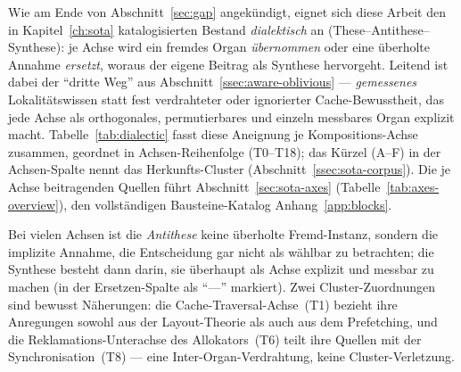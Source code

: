 Wie am Ende von Abschnitt~\ref{sec:gap} angekündigt, eignet sich diese Arbeit den in
Kapitel~\ref{ch:sota} katalogisierten Bestand \emph{dialektisch} an (These--Antithese--Synthese): je
Achse wird ein fremdes Organ \emph{übernommen} oder eine überholte Annahme \emph{ersetzt}, woraus der
eigene Beitrag als Synthese hervorgeht. Leitend ist dabei der \enquote{dritte Weg} aus
Abschnitt~\ref{ssec:aware-oblivious} --- \emph{gemessenes} Lokalitätswissen statt fest verdrahteter
oder ignorierter Cache-Bewusstheit, das jede Achse als orthogonales, permutierbares und einzeln
messbares Organ explizit macht.
Tabelle~\ref{tab:dialectic} fasst diese Aneignung je Kompositions-Achse zusammen, geordnet in
Achsen-Reihenfolge (T0--T18); das Kürzel (A--F) in der Achsen-Spalte nennt das Herkunfts-Cluster
(Abschnitt~\ref{ssec:sota-corpus}). Die je Achse beitragenden Quellen
führt Abschnitt~\ref{sec:sota-axes} (Tabelle~\ref{tab:axes-overview}), den vollständigen
Bausteine-Katalog Anhang~\ref{app:blocks}.

Bei vielen Achsen ist die \emph{Antithese} keine überholte Fremd-Instanz, sondern die implizite
Annahme, die Entscheidung gar nicht als wählbar zu betrachten; die Synthese besteht dann darin, sie
überhaupt als Achse explizit und messbar zu machen (in der Ersetzen-Spalte als \enquote{---}
markiert). Zwei Cluster-Zuordnungen sind bewusst Näherungen: die Cache-Traversal-Achse~(T1) bezieht
ihre Anregungen sowohl aus der Layout-Theorie als auch aus dem Prefetching, und die
Reklamations-Unterachse des Allokators~(T6) teilt ihre Quellen mit der Synchronisation~(T8) --- eine
Inter-Organ-Verdrahtung, keine Cluster-Verletzung.

